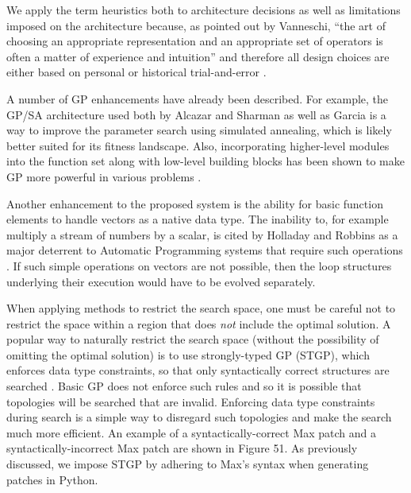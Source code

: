 \documentclass[12pt]{report} 	%
\numberwithin{figure}{chapter}
\numberwithin{table}{chapter}
\numberwithin{equation}{chapter}
\begin{document}
\begin{flushleft}
We apply the term heuristics both to architecture decisions as well as limitations imposed on the architecture because, as pointed out by Vanneschi, ``the art of choosing an appropriate representation and an appropriate set of operators is often a matter of experience and intuition'' and therefore all design choices are either based on personal or historical trial-and-error \cite[p. 6]{Vanneschi:2004le}.

A number of GP enhancements have already been described. For example, the GP/SA architecture used both by Alcazar and Sharman \cite{Alcazar:1996la} as well as Garcia \cite{Garcia:2002cq} is a way to improve the parameter search using simulated annealing, which is likely better suited for its fitness landscape. Also, incorporating higher-level modules into the function set along with low-level building blocks has been shown to make GP more powerful in various problems \cite{Koza:1997zr}. 

Another enhancement to the proposed system is the ability for basic function elements to handle vectors as a native data type. The inability to, for example multiply a stream of numbers by a scalar, is cited by Holladay and Robbins as a major deterrent to Automatic Programming systems that require such operations \cite[p. 1]{Holladay:2007ct}. If such simple operations on vectors are not possible, then the loop structures underlying their execution would have to be evolved separately.

When applying methods to restrict the search space, one must be careful not to restrict the space within a region that does \textit{not} include the optimal solution. A popular way to naturally restrict the search space (without the possibility of omitting the optimal solution) is to use strongly-typed GP (STGP), which enforces data type constraints, so that only syntactically correct structures are searched  \cite{Vanneschi:2004le, Harris:1997qf, Pachet:2007if}. Basic GP does not enforce such rules and so it is possible that topologies will be searched that are invalid. Enforcing data type constraints during search is a simple way to disregard such topologies and make the search much more efficient. An example of a syntactically-correct Max patch and a syntactically-incorrect Max patch are shown in Figure 51. As previously discussed, we impose STGP by adhering to Max's syntax when generating patches in Python.


\end{flushleft}
\end{document}
